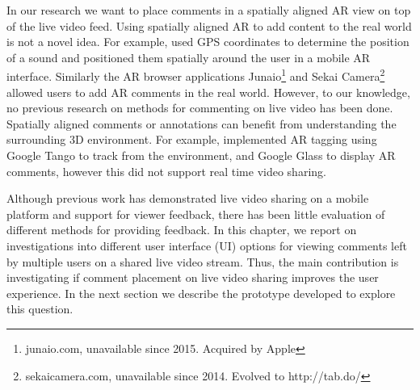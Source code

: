 


In our research we want to place comments in a spatially aligned AR view on top of the live video feed. Using spatially aligned AR to add content to the real world is not a novel idea. For example, \cite{Langlotz2013} used GPS coordinates to determine the position of a sound and positioned them spatially around the user in a mobile AR interface. Similarly the AR browser applications Junaio\footnote{junaio.com, unavailable since 2015. Acquired by Apple} and Sekai Camera\footnote{sekaicamera.com, unavailable since 2014. Evolved to http://tab.do/} allowed users to add AR comments in the real world. However, to our knowledge, no previous research on methods for commenting on live video has been done. Spatially aligned comments or annotations can benefit from understanding the surrounding 3D environment. For example, \cite{Nassani2015} implemented AR tagging using Google Tango to track from the environment, and Google Glass to display AR comments, however this did not support real time video sharing. 

Although previous work has demonstrated live video sharing on a mobile platform and support for viewer feedback, there has been little evaluation of different methods for providing feedback. In this chapter, we report on investigations into different user interface (UI) options for viewing comments left by multiple users on a shared live video stream. Thus, the main contribution is investigating if comment placement on live video sharing improves the user experience. In the next section we describe the prototype developed to explore this question.

